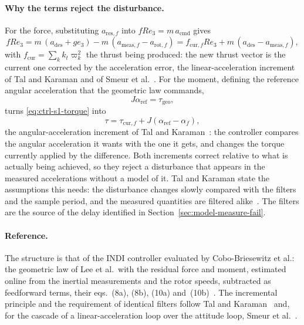 \paragraph{Why the terms reject the disturbance.} For the force, substituting
$a_{\mathrm{res},f}$ into $f R e_3 = m\,a_{\mathrm{cmd}}$ gives
\begin{equation*}
  f R e_3 = m\,(a_{\mathrm{des}} + g e_3) - m\,(a_{\mathrm{meas},f} - a_{\mathrm{rot},f})
          = f_{\mathrm{cur},f} R e_3 + m\,(a_{\mathrm{des}} - a_{\mathrm{meas},f}),
\end{equation*}
with $f_{\mathrm{cur}} = \sum_k k_t \varpi_k^2$ the thrust being produced: the new thrust vector is
the current one corrected by the acceleration error, the linear-acceleration increment of Tal and
Karaman and of Smeur et al.~\cite{tal2018indi,smeur2017cascadedindi}. For the moment, defining the
reference angular acceleration that the geometric law commands,
\begin{equation}
  J\alpha_{\mathrm{ref}} = \tau_{\mathrm{geo}},
  \label{eq:ctrl-alpharef}
\end{equation}
turns \eqref{eq:ctrl-s1-torque} into
\begin{equation}
  \tau = \tau_{\mathrm{cur},f} + J\left(\alpha_{\mathrm{ref}} - \alpha_f\right),
  \label{eq:ctrl-indi-tau}
\end{equation}
the angular-acceleration increment of Tal and Karaman~\cite{tal2018indi}: the controller compares
the angular acceleration it wants with the one it gets, and changes the torque currently applied by
the difference. Both increments correct relative to what is actually being achieved, so they reject
a disturbance that appears in the measured accelerations without a model of it. Tal and Karaman
state the assumptions this needs: the disturbance changes slowly compared with the filters and the
sample period, and the measured quantities are filtered alike~\cite{tal2018indi}. The filters are
the source of the delay identified in Section~\ref{sec:model-measure-fail}.

\paragraph{Reference.} The structure is that of the INDI controller evaluated by Cobo-Briesewitz
et al.: the geometric law of Lee et al.\ with the residual force and moment, estimated online from
the inertial measurements and the rotor speeds, subtracted as feedforward terms, their eqs.~(8a),
(8b), (10a) and~(10b)~\cite{cobobriesewitz2026lindi}. The incremental principle and the requirement
of identical filters follow Tal and Karaman~\cite{tal2018indi} and, for the cascade of a
linear-acceleration loop over the attitude loop, Smeur et al.~\cite{smeur2017cascadedindi}.

